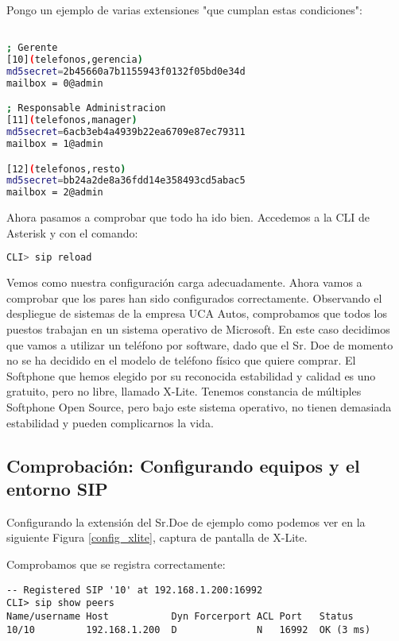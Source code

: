 Pongo un ejemplo de varias extensiones "que cumplan estas condiciones":

\begin{lstlisting}[language=bash,title={/etc/asterisk/sip.conf}]

; Gerente
[10](telefonos,gerencia)
md5secret=2b45660a7b1155943f0132f05bd0e34d
mailbox = 0@admin

; Responsable Administracion
[11](telefonos,manager)
md5secret=6acb3eb4a4939b22ea6709e87ec79311
mailbox = 1@admin

[12](telefonos,resto)
md5secret=bb24a2de8a36fdd14e358493cd5abac5
mailbox = 2@admin

\end{lstlisting}

Ahora pasamos a comprobar que todo ha ido bien. Accedemos a la CLI de Asterisk y con el comando:

\begin{lstlisting}[language=sh]
CLI> sip reload
\end{lstlisting}

Vemos como nuestra configuración carga adecuadamente. Ahora vamos a comprobar que los pares han sido configurados correctamente. Observando el despliegue de sistemas de la empresa UCA Autos, comprobamos que todos los puestos trabajan en un sistema operativo de Microsoft. En este caso decidimos que vamos a utilizar un teléfono por software, dado que el Sr. Doe de momento no se ha decidido en el modelo de teléfono físico que quiere comprar. El Softphone que hemos elegido por su reconocida estabilidad y calidad es uno gratuito, pero no libre, llamado X-Lite. Tenemos constancia de múltiples Softphone Open Source, pero bajo este sistema operativo, no tienen demasiada estabilidad y pueden complicarnos la vida.

\subsection{Comprobación: Configurando equipos y el entorno SIP}

Configurando la extensión del Sr.Doe de ejemplo como podemos ver en la siguiente Figura \ref{config_xlite}, captura de pantalla de X-Lite.


Comprobamos que se registra correctamente:

\begin{lstlisting}[style=consola]
-- Registered SIP '10' at 192.168.1.200:16992
CLI> sip show peers
Name/username Host           Dyn Forcerport ACL Port   Status
10/10         192.168.1.200  D              N   16992  OK (3 ms)
\end{lstlisting}

